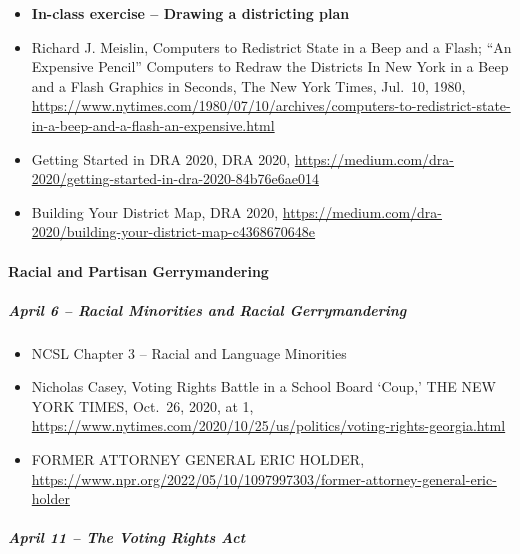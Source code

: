 \documentclass[
]{article}
\providecommand{\tightlist}{%
  \setlength{\itemsep}{0pt}\setlength{\parskip}{0pt}}
\begin{document}
\begin{itemize}
\tightlist
\item
  \textbf{In-class exercise -- Drawing a districting plan}
\item
  Richard J. Meislin, Computers to Redistrict State in a Beep and a
  Flash; ``An Expensive Pencil'' Computers to Redraw the Districts In
  New York in a Beep and a Flash Graphics in Seconds, The New York
  Times, Jul.~10, 1980,
  \url{https://www.nytimes.com/1980/07/10/archives/computers-to-redistrict-state-in-a-beep-and-a-flash-an-expensive.html}
\item
  Getting Started in DRA 2020, DRA 2020,
  \url{https://medium.com/dra-2020/getting-started-in-dra-2020-84b76e6ae014}
\item
  Building Your District Map, DRA 2020,
  \url{https://medium.com/dra-2020/building-your-district-map-c4368670648e}
\end{itemize}

\hypertarget{racial-and-partisan-gerrymandering}{%
\paragraph{Racial and Partisan
Gerrymandering}\label{racial-and-partisan-gerrymandering}}

\hypertarget{april-6-racial-minorities-and-racial-gerrymandering}{%
\subparagraph{April 6 -- Racial Minorities and Racial
Gerrymandering}\label{april-6-racial-minorities-and-racial-gerrymandering}}

\begin{itemize}
\tightlist
\item
  NCSL Chapter 3 -- Racial and Language Minorities
\item
  Nicholas Casey, Voting Rights Battle in a School Board `Coup,' THE NEW
  YORK TIMES, Oct.~26, 2020, at 1,
  \url{https://www.nytimes.com/2020/10/25/us/politics/voting-rights-georgia.html}
\item
  FORMER ATTORNEY GENERAL ERIC HOLDER,
  \url{https://www.npr.org/2022/05/10/1097997303/former-attorney-general-eric-holder}
\end{itemize}

\hypertarget{april-11-the-voting-rights-act}{%
\subparagraph{April 11 -- The Voting Rights
Act}\label{april-11-the-voting-rights-act}}
\end{document}

